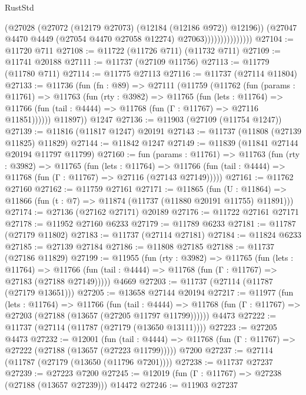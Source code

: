 \begin{lexlean}{RustStd}
\begin{coremodule}
                                (@27028 (@27072 (@12179 @27073) (@12184 (@12186 @972)) @12196))
                                (@27047
                                  @4470
                                  @4449
                                  (@27054 @4470 @27058 @12274)
                                  @27063)))))))))))))))
@27104 := @11720 @711
@27108 := @11722 (@11726 @711) (@11732 @711)
@27109 := @11741 @20188
@27111 := @11737 (@27109 @11756)
@27113 := @11779 (@11780 @711)
@27114 := @11775 @27113
@27116 := @11737 (@27114 @11804)
@27133 := @11736
    (fun (fn : @89) =>
    @27111
      (@11759
        (@11762
          (fun (params : @11761) =>
          @11763
            (fun (rty : @3982) =>
            @11765
              (fun (lets : @11764) =>
              @11766 (fun (tail : @4444) => @11768 (fun (Γ : @11767) => @27116 @11851))))))
        @11897))
    @1247
@27136 := @11903 (@27109 (@11754 @1247))
@27139 := @11816 (@11817 @1247) @20191
@27143 := @11737 (@11808 (@27139 @11825) @11829)
@27144 := @11842 @1247
@27149 := @11839 (@11841 @27144 @20194 @11797 @11799)
@27160 := fun (params : @11761) =>
  @11763
    (fun (rty : @3982) =>
    @11765
      (fun (lets : @11764) =>
      @11766 (fun (tail : @4444) => @11768 (fun (Γ : @11767) => @27116 (@27143 @27149)))))
@27161 := @11762 @27160
@27162 := @11759 @27161
@27171 := @11865
    (fun (U : @11864) => @11866 (fun (t : @7) => @11874 (@11737 (@11880 @20191 @11755) @11891)))
@27174 := @27136 (@27162 @27171) @20189
@27176 := @11722 @27161 @27171
@27178 := @11952 @27160 @6233
@27179 := @11789 @6233
@27181 := @11787 (@27179 @11802)
@27183 := @11737 (@27114 @27181)
@27184 := @11824 @6233
@27185 := @27139 @27184
@27186 := @11808 @27185
@27188 := @11737 (@27186 @11829)
@27199 := @11955
    (fun (rty : @3982) =>
    @11765
      (fun (lets : @11764) =>
      @11766 (fun (tail : @4444) => @11768 (fun (Γ : @11767) => @27183 (@27188 @27149)))))
    @4669
@27203 := @11737 (@27114 (@11787 (@27179 @13651)))
@27205 := @13658 @27144 @20194
@27217 := @11977
    (fun (lets : @11764) =>
    @11766
      (fun (tail : @4444) =>
      @11768 (fun (Γ : @11767) => @27203 (@27188 (@13657 (@27205 @11797 @11799))))))
    @4473
@27222 := @11737 (@27114 (@11787 (@27179 (@13650 @13111))))
@27223 := @27205 @4473
@27232 := @12001
    (fun (tail : @4444) => @11768 (fun (Γ : @11767) => @27222 (@27188 (@13657 (@27223 @11799)))))
    @7200
@27237 := @27114 (@11787 (@27179 (@13650 (@11796 @7201))))
@27238 := @11737 @27237
@27239 := @27223 @7200
@27245 := @12019 (fun (Γ : @11767) => @27238 (@27188 (@13657 @27239))) @14472
@27246 := @11903 @27237

\end{coremodule}
\end{lexlean}
